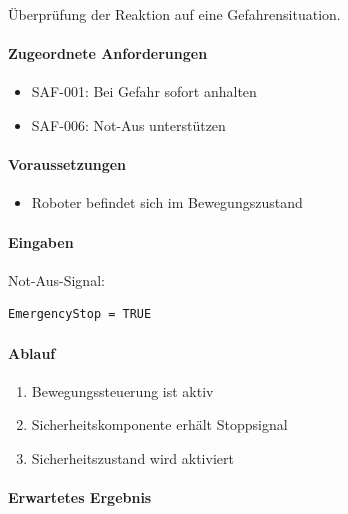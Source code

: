 Überprüfung der Reaktion auf eine Gefahrensituation.

\paragraph{Zugeordnete Anforderungen}\label{zugeordnete-anforderungen-7}

\begin{itemize}
\tightlist
\item
  SAF-001: Bei Gefahr sofort anhalten
\item
  SAF-006: Not-Aus unterstützen
\end{itemize}

\paragraph{Voraussetzungen}\label{voraussetzungen-7}

\begin{itemize}
\tightlist
\item
  Roboter befindet sich im Bewegungszustand
\end{itemize}

\paragraph{Eingaben}\label{eingaben-7}

Not-Aus-Signal:

\begin{verbatim}
EmergencyStop = TRUE
\end{verbatim}

\paragraph{Ablauf}\label{ablauf-7}

\begin{enumerate}
\def\labelenumi{\arabic{enumi}.}
\tightlist
\item
  Bewegungssteuerung ist aktiv
\item
  Sicherheitskomponente erhält Stoppsignal
\item
  Sicherheitszustand wird aktiviert
\end{enumerate}

\paragraph{Erwartetes Ergebnis}\label{erwartetes-ergebnis-7}


